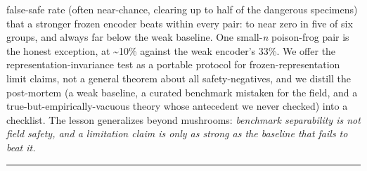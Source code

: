 false-safe rate (often near-chance, clearing up to half of the dangerous
specimens) that a stronger frozen encoder beats within every pair: to
near zero in five of six groups, and always far below the weak baseline.
One small-\emph{n} poison-frog pair is the honest exception, at
\textasciitilde10\% against the weak encoder's 33\%. We offer the
representation-invariance test as a portable protocol for
frozen-representation limit claims, not a general theorem about all
safety-negatives, and we distill the post-mortem (a weak baseline, a
curated benchmark mistaken for the field, and a
true-but-empirically-vacuous theory whose antecedent we never checked)
into a checklist. The lesson generalizes beyond mushrooms:
\emph{benchmark separability is not field safety, and a limitation claim
is only as strong as the baseline that fails to beat it.}

\begin{center}\rule{0.5\linewidth}{0.5pt}\end{center}
